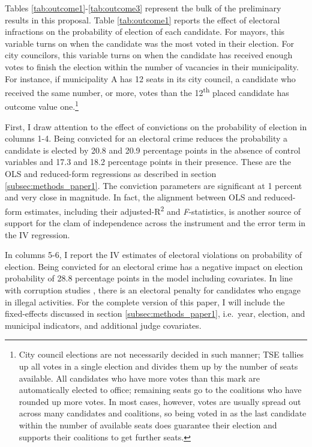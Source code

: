 \documentclass[11pt]{article}
\begin{document}
Tables \ref{tab:outcome1}-\ref{tab:outcome3} represent the bulk of the preliminary results in this proposal. Table \ref{tab:outcome1} reports the effect of electoral infractions on the probability of election of each candidate. For mayors, this variable turns on when the candidate was the most voted in their election. For city councilors, this variable turns on when the candidate has received enough votes to finish the election within the number of vacancies in their municipality. For instance, if municipality A has 12 seats in its city council, a candidate who received the same number, or more, votes than the 12\textsuperscript{th} placed candidate has outcome value one.\footnote{City council elections are not necessarily decided in such manner; TSE tallies up all votes in a single election and divides them up by the number of seats available. All candidates who have more votes than this mark are automatically elected to office; remaining seats go to the coalitions who have rounded up more votes. In most cases, however, votes are usually spread out across many candidates and coalitions, so being voted in as the last candidate within the number of available seats does guarantee their election and supports their coalitions to get further seats.}



First, I draw attention to the effect of convictions on the probability of election in columns 1-4. Being convicted for an electoral crime reduces the probability a candidate is elected by 20.8 and 20.9 percentage points in the absence of control variables and 17.3 and 18.2 percentage points in their presence. These are the OLS and reduced-form regressions as described in section \ref{subsec:methods_paper1}. The conviction parameters are significant at 1 percent and very close in magnitude. In fact, the alignment between OLS and reduced-form estimates, including their adjusted-R\textsuperscript{2} and \emph{F}-statistics, is another source of support for the clam of independence across the instrument and the error term in the IV regression.

In columns 5-6, I report the IV estimates of electoral violations on probability of election. Being convicted for an electoral crime has a negative impact on election probability of 28.8 percentage points in the model including covariates. In line with corruption studies \citep{FerrazElectoralAccountabilityCorruption2011a,ChongLookingIncumbentExposing2013}, there is an electoral penalty for candidates who engage in illegal activities. For the complete version of this paper, I will include the fixed-effects discussed in section \ref{subsec:methods_paper1}, i.e.~year, election, and municipal indicators, and additional judge covariates.
\end{document}
